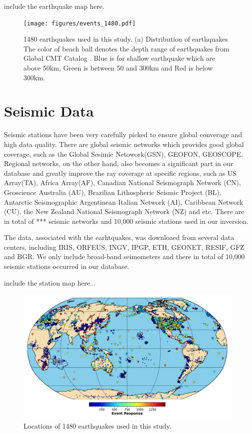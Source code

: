 \documentclass[extra,mreferee]{gji}
\begin{document}
include the earthquake map here.

\begin{figure}
\texttt{[image: figures/events\_1480.pdf]}
\caption{1480 earthquakes used in this study. (a) Distribution of earthquakes The color of beach ball denotes the depth range of earthquakes from Global CMT Catalog \cite{GlobalCMT}. {\color{Blue}Blue} is for shallow earthquake which are above 50km, {\color{Green}Green} is between 50 and 300km and {\color{Red}Red} is below 300km.}
\centering
\end{figure}

\section{Seismic Data}

Seismic stations have been very carefully picked to ensure global converage and high data quality. There are global seismic networks which provides good global coverage, such as the Global Sesimic Netowork(GSN), GEOFON, GEOSCOPE. Regional networks, on the other hand, also becomes a significant part in our database and greatly improve the ray coverage at specific regions, such as US Array(TA), Africa Array(AF), Canadian National Seismograph Network (CN), Geoscience Australia (AU), Brazilian Lithospheric Seismic Project (BL), Antarctic Seismographic Argentinean Italian Network (AI), Caribbean Network (CU), the New Zealand National Seismograph Network (NZ) and etc. There are in total of *** seismic networks and 10,000 seismic stations used in our inversion.

The data, associated with the earhtquakes, was downloaed from several data centers, including IRIS, ORFEUS, INGV, IPGP, ETH, GEONET, RESIF, GFZ and BGR. We only include broad-band seimometers and there in total of 10,000 seismic stations occurred in our database.

include the station map here...

\begin{figure}
\includegraphics[width=\textwidth]{figures/station_map.pdf}
\caption{Locations of 1480 earthquakes used in this study.}
\centering
\end{figure}
\end{document}
